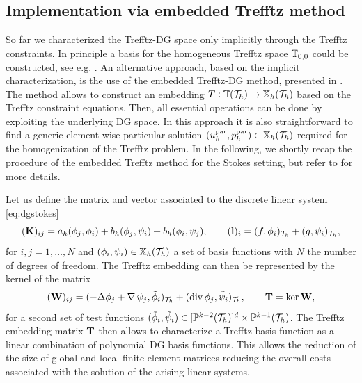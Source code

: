 \documentclass[pdflatex,sn-mathphys,Numbered]{sn-jnl}%
\theoremstyle{remark}%
\theoremstyle{definition}%
\begin{document}
\subsection{Implementation via embedded Trefftz method}\label{sec:impl}
So far we characterized the Trefftz-DG space only implicitly through the Trefftz
constraints. In principle a basis for the homogeneous Trefftz space $\mathbb{T}_{0,0}$ could be
constructed, see e.g. \cite{POITOU2000561,Bouberbachene}. %
An alternative approach, based on the implicit characterization, is the use of the embedded Trefftz-DG method,
presented in \cite{2201.07041}.
The method allows to construct an embedding $T:
\mathbb{T}({\mathcal{T}_h}) \to \mathbb{X}_h({\mathcal{T}_h})$ based on the Trefftz constraint equations. Then, all
essential operations can be done by exploiting the underlying DG space. In this
approach it is also straightforward to find a generic element-wise particular
solution $(u_{h}^{\textrm{par}},p_{h}^{\textrm{par}})\in \mathbb{X}_h({\mathcal{T}_h})$ required for the homogenization of the
Trefftz problem. In the following, we shortly recap the procedure of the embedded Trefftz method for the Stokes
setting, but refer to \cite{2201.07041} for more details. 

Let us define the matrix and vector associated to the discrete linear system \eqref{eq:dgstokes}
\begin{equation*}\label{def:matrices}
    (\mathbf{K})_{ij}=a_h(\phi_j,\phi_i)+b_h(\phi_j,\psi_i)+b_h(\phi_i,\psi_j),
     \qquad 
    (\mathbf{l})_i = (f,\phi_i)_{\mathcal{T}_h} + (g,\psi_i)_{\mathcal{T}_h},
\end{equation*}
for $i,j = 1,\dots, N$ and $(\phi_i,\psi_i)\in \mathbb{X}_h({\mathcal{T}_h})$ a set of basis functions with $N$ the number of degrees of freedom.
The Trefftz embedding can then be represented by the kernel of the matrix
\begin{equation*}
    (\mathbf{W})_{ij}=(-\Delta \phi_j + \operatorname{\nabla}\psi_j, \tilde\phi_i)_{\mathcal{T}_h} + (\operatorname{\mathrm{div}}\phi_j, \tilde\psi_i)_{\mathcal{T}_h},\qquad \mathbf{T}=\ker\mathbf{W},
\end{equation*}
for a second set of test functions $(\tilde\phi_i, \tilde\psi_i)\in
[\mathbb{P}^{k-2}({\mathcal{T}_h})]^d \times \mathbb{P}^{k-1}({\mathcal{T}_h})$. The Trefftz embedding matrix $\mathbf{T}$
then allows to characterize a Trefftz basis function as a linear
combination of polynomial DG basis functions. This allows the reduction of the
size of global and local finite element matrices reducing the overall costs
associated with the solution of the arising linear systems.
\end{document}
